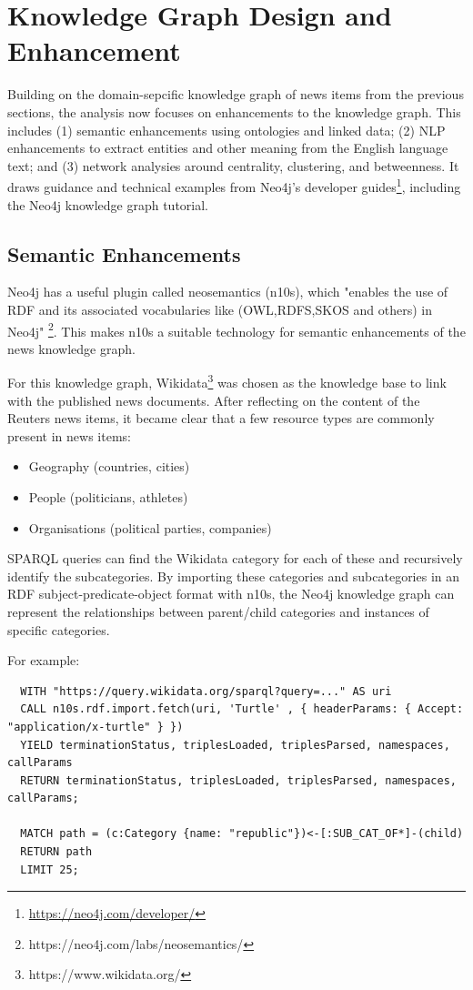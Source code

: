\documentclass[11pt]{article}
\begin{document}
\section{Knowledge Graph Design and Enhancement}

Building on the domain-sepcific knowledge graph of news items from the previous sections, the analysis now focuses on enhancements to the knowledge graph. This includes (1) semantic enhancements using ontologies and linked data; (2) NLP enhancements to extract entities and other meaning from the English language text; and (3) network analysies around centrality, clustering, and betweenness. It draws guidance and technical examples from Neo4j's developer guides\footnote{\url{https://neo4j.com/developer/}}, including the Neo4j knowledge graph tutorial\cite{neo4j-kg-tutorial}.

\subsection{Semantic Enhancements}

Neo4j has a useful plugin called neosemantics (n10s), which "enables the use of RDF and its associated vocabularies like (OWL,RDFS,SKOS and others) in Neo4j" \footnote{https://neo4j.com/labs/neosemantics/}. This makes n10s a suitable technology for semantic enhancements of the news knowledge graph.

For this knowledge graph, Wikidata\footnote{https://www.wikidata.org/} was chosen as the knowledge base to link with the published news documents. After reflecting on the content of the Reuters news items, it became clear that a few resource types are commonly present in news items:
\begin{itemize}
  \item{Geography (countries, cities)}
  \item{People (politicians, athletes)}
  \item{Organisations (political parties, companies)}
\end{itemize}

SPARQL queries can find the Wikidata category for each of these and recursively identify the subcategories. By importing these categories and subcategories in an RDF subject-predicate-object format with n10s, the Neo4j knowledge graph can represent the relationships between parent/child categories and instances of specific categories.

For example:
\begin{lstlisting}
  WITH "https://query.wikidata.org/sparql?query=..." AS uri
  CALL n10s.rdf.import.fetch(uri, 'Turtle' , { headerParams: { Accept: "application/x-turtle" } })
  YIELD terminationStatus, triplesLoaded, triplesParsed, namespaces, callParams
  RETURN terminationStatus, triplesLoaded, triplesParsed, namespaces, callParams;

  MATCH path = (c:Category {name: "republic"})<-[:SUB_CAT_OF*]-(child)
  RETURN path
  LIMIT 25;
\end{lstlisting}
\end{document}
